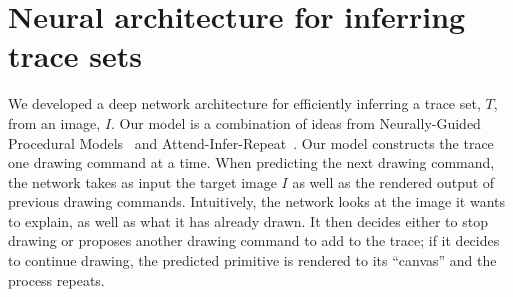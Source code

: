 \documentclass{article}
\newcommand{\remark}[1]{\textcolor{red}{[#1]}}
\theoremstyle{definition}
\begin{document}





\section{Neural architecture for inferring trace sets}\label{neuralNetworkSection}

We developed a deep network architecture for efficiently inferring a
trace set, $T$, from an image, $I$.
Our model is a combination of  ideas from 
Neurally-Guided Procedural Models~\citep{ritchie2016neurally}
and Attend-Infer-Repeat~\citep{eslami1603attend}.
Our model constructs the
trace one drawing command at a time.  When predicting the next drawing
command, the network takes as input the target image $I$ as well as
the rendered output of previous drawing commands.  Intuitively, the
network looks at the image it wants to explain, as well as what it has
already drawn.  It then decides either to stop drawing or proposes
another drawing command to add to the trace; if it decides
to continue drawing, the predicted primitive is rendered to its
``canvas'' and the process repeats.
\end{document}
